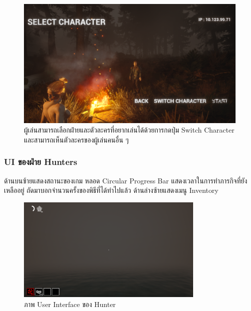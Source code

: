 \begin{figure}[h!]
  \begin{center}
  \includegraphics[width=\textwidth]{./img/UI/select_character.png}
  \end{center}
  \caption[หน้าเลือกตัวละครหลังจากเข้าร่วมห้องแล้ว]{ผู้เล่นสามารถเลือกฝ่ายและตัวละครที่อยากเล่นได้ด้วยการกดปุ่ม Switch Character และสามารถเห็นตัวละครของผู้เล่นคนอื่น ๆ}
  \label{fig:select_character}
\end{figure}

\subsubsection{UI ของฝ่าย Hunters}

ด้านบนซ้ายแสดงสถานะของเกม หลอด Circular Progress Bar แสดงเวลาในการทำภารกิจที่ยังเหลืออยู่ ถัดมาบอกจำนวนครั้งของพิธีที่ได้ทำไปแล้ว
ด้านล่างซ้ายแสดงเมนู Inventory

\begin{figure}[h]
  \begin{center}
  \includegraphics[width=0.8\textwidth]{./img/UI/hunter_ui.png}
  \end{center}
  \caption[ภาพ User Interface ของ Hunter]{ภาพ User Interface ของ Hunter}
  \label{fig:hunter_ui}
\end{figure}

